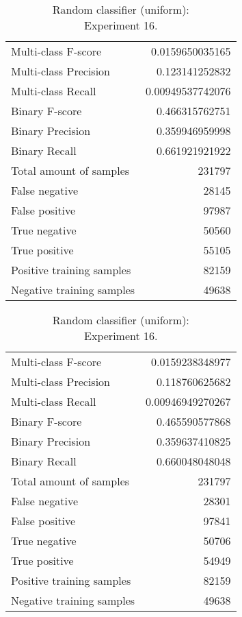 \begin{table}[H]
\begin{minipage}{0.5\textwidth}
\caption{Random classifier (uniform): \\Experiment 15.}
\centering
\begin{tabular}{l r}
\toprule
Multi-class F-score & 0.0159650035165 \\
Multi-class Precision & 0.123141252832 \\
Multi-class Recall & 0.00949537742076 \\
\midrule
Binary F-score & 0.466315762751 \\
Binary Precision & 0.359946959998 \\
Binary Recall & 0.661921921922 \\
\midrule
Total amount of samples & 231797 \\
False negative & 28145 \\
False positive & 97987 \\
True negative & 50560 \\
True positive & 55105 \\
\midrule
Positive training samples & 82159 \\
Negative training samples & 49638 \\
\bottomrule
\end{tabular}
\end{minipage}
\hfillx
\begin{minipage}{0.5\textwidth}
\caption{Random classifier (uniform): \\Experiment 16.}
\centering
\begin{tabular}{l r}
\toprule
Multi-class F-score & 0.0159238348977 \\
Multi-class Precision & 0.118760625682 \\
Multi-class Recall & 0.00946949270267 \\
\midrule
Binary F-score & 0.465590577868 \\
Binary Precision & 0.359637410825 \\
Binary Recall & 0.660048048048 \\
\midrule
Total amount of samples & 231797 \\
False negative & 28301 \\
False positive & 97841 \\
True negative & 50706 \\
True positive & 54949 \\
\midrule
Positive training samples & 82159 \\
Negative training samples & 49638 \\
\bottomrule
\end{tabular}
\end{minipage}
\end{table}
